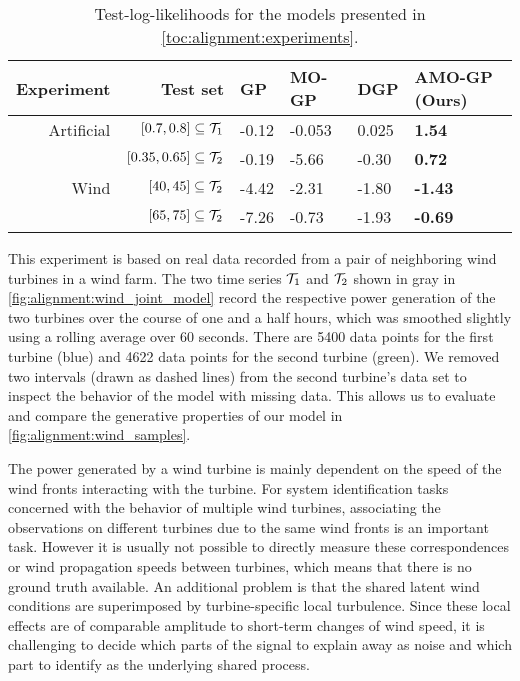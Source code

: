 \begin{table}[tp]
    \centering
    \caption{
        \label{tab:alignment:dampened_sine_model_log_likelihoods}
        Test-log-likelihoods for the models presented in \cref{toc:alignment:experiments}.
    }
    \begin{tabularx}{\linewidth}{rrYYYY}
        \toprule
        Experiment & Test set                       & GP    & MO-GP  & DGP   & AMO-GP (Ours)  \\
        \midrule
        Artificial & $[0.7, 0.8] \subseteq \mathcal{T}_1$   & -0.12 & -0.053 & 0.025 & \textbf{1.54}  \\
                   & $[0.35, 0.65] \subseteq \mathcal{T}_2$ & -0.19 & -5.66  & -0.30 & \textbf{0.72}  \\
        \midrule
        Wind       & $[40, 45] \subseteq \mathcal{T}_2 $    & -4.42 & -2.31  & -1.80 & \textbf{-1.43} \\
                   & $[65, 75] \subseteq \mathcal{T}_2 $    & -7.26 & -0.73  & -1.93 & \textbf{-0.69} \\
        \bottomrule
    \end{tabularx}
\end{table}
This experiment is based on real data recorded from a pair of neighboring wind turbines in a wind farm.
The two time series $\mathcal{T}_1$ and $\mathcal{T}_2$ shown in gray in \cref{fig:alignment:wind_joint_model} record the respective power generation of the two turbines over the course of one and a half hours, which was smoothed slightly using a rolling average over 60 seconds.
There are 5400 data points for the first turbine (blue) and 4622 data points for the second turbine (green).
We removed two intervals (drawn as dashed lines) from the second turbine's data set to inspect the behavior of the model with missing data.
This allows us to evaluate and compare the generative properties of our model in \cref{fig:alignment:wind_samples}.

The power generated by a wind turbine is mainly dependent on the speed of the wind fronts interacting with the turbine.
For system identification tasks concerned with the behavior of multiple wind turbines, associating the observations on different turbines due to the same wind fronts is an important task.
However it is usually not possible to directly measure these correspondences or wind propagation speeds between turbines, which means that there is no ground truth available.
An additional problem is that the shared latent wind conditions are superimposed by turbine-specific local turbulence.
Since these local effects are of comparable amplitude to short-term changes of wind speed, it is challenging to decide which parts of the signal to explain away as noise and which part to identify as the underlying shared process.

